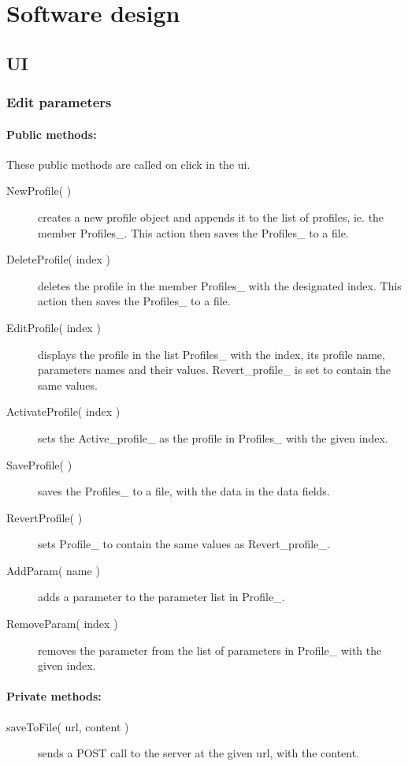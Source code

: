 \section{Software design}

\subsection{UI}
\subsubsection{Edit parameters}

\paragraph{Public methods:}
These public methods are called on click in the ui.
\begin{adjustwidth}{2.5em}{0pt}\begin{description}
	\item[NewProfile( )] creates a new profile object and appends it to the list of profiles, ie. the member Profiles_. This action then saves the Profiles_ to a file.
	\item[DeleteProfile( index )] deletes the profile in the member Profiles_ with the designated index. This action then saves the Profiles_ to a file.
	\item[EditProfile( index )] displays the profile in the list Profiles_ with the index, its profile name, parameters names and their values. Revert_profile_ is set to contain the same values.
	\item[ActivateProfile( index )] sets the Active_profile_ as the profile in Profiles_ with the given index.
	\item[SaveProfile( )]  saves the Profiles_ to a file, with the data in the data fields.
	\item[RevertProfile( )] sets Profile_ to contain the same values as Revert_profile_.
	\item[AddParam( name )] adds a parameter to the parameter list in Profile_.
	\item[RemoveParam( index )] removes the parameter from the list of parameters in Profile_ with the given index.
\end{description}\end{adjustwidth}


\paragraph{Private methods:}
\begin{adjustwidth}{2.5em}{0pt}\begin{description}
	\item[saveToFile( url, content )] sends a POST call to the server at the given url, with the content.
\end{description}\end{adjustwidth}

